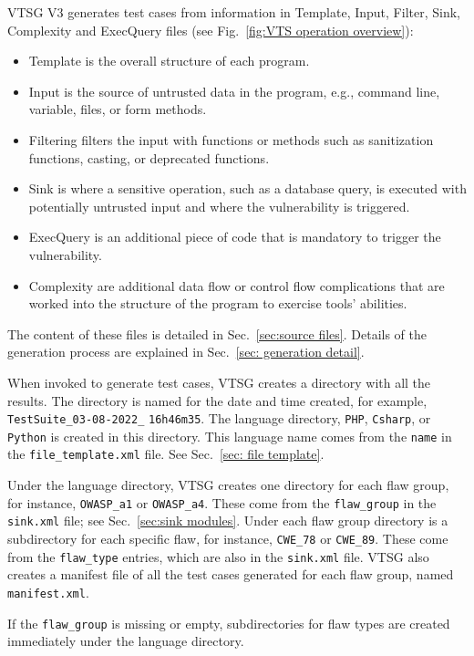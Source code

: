\documentclass[12pt]{article}
\begin{document}
VTSG V3 generates test cases from information in Template, Input,
Filter, Sink, Complexity and ExecQuery files 
(see Fig.~\ref{fig:VTS operation overview}):
\begin{itemize}
 \item Template is the overall structure of each program.
 \item Input is the source of untrusted data in the program, e.g., 
 command line, variable, files, or form methods.
 \item Filtering filters the input with functions or methods such as sanitization
   functions, casting, or deprecated functions.
 \item Sink is where a sensitive operation, such as a database query, 
 is executed with potentially untrusted input and where the 
 vulnerability is triggered.
 \item ExecQuery is an additional piece of code that is mandatory to 
 trigger the vulnerability.
 \item Complexity are additional data flow or control flow complications that are
   worked into the structure of the program to exercise tools' abilities.
\end{itemize}
The content of these files is detailed in
Sec.~\ref{sec:source files}.
Details of the generation process are explained in
Sec.~\ref{sec: generation detail}.

\label{sec:case directory structure}
When invoked to generate test cases, VTSG creates a directory with all the results.
The directory is named for the date and time created, for example,
\verb|TestSuite_03-08-2022_| \verb|16h46m35|.
The language directory, \verb|PHP|,
\verb|Csharp|, or \verb|Python| is created in this directory.
This language name comes from the \verb|name|
in the \verb|file_template.xml| file.  See Sec.~\ref{sec: file template}.

Under the language directory, VTSG creates one directory for each flaw group, for
instance, \verb|OWASP_a1| or \verb|OWASP_a4|.  These come from the \verb|flaw_group|
in the \verb|sink.xml| file; see Sec.~\ref{sec:sink modules}.
Under each flaw group directory is a subdirectory for each specific flaw, for
instance, \verb|CWE_78| or \verb|CWE_89|.  These come from the \verb|flaw_type|
entries, which are also in the \verb|sink.xml| file.
VTSG also creates a manifest file of all the test cases generated for each flaw
group, named
\verb|manifest.xml|.

If the \verb|flaw_group| is missing or empty, subdirectories for flaw types are
created immediately under the language directory.
\end{document}
